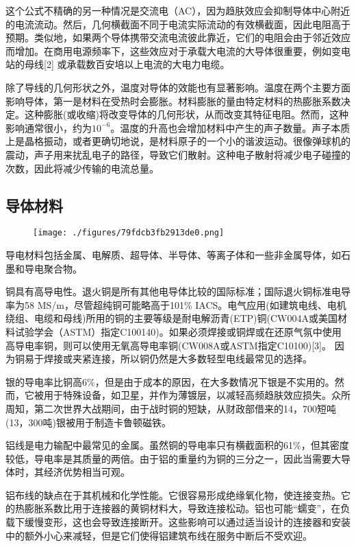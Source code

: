 这个公式不精确的另一种情况是交流电（AC），因为趋肤效应会抑制导体中心附近的电流流动。然后，几何横截面不同于电流实际流动的有效横截面，因此电阻高于预期。类似地，如果两个导体携带交流电流彼此靠近，它们的电阻会由于邻近效应而增加。在商用电源频率下，这些效应对于承载大电流的大导体很重要，例如变电站的母线[2] 或承载数百安培以上电流的大电力电缆。

除了导线的几何形状之外，温度对导体的效能也有显著影响。温度在两个主要方面影响导体，第一是材料在受热时会膨胀。材料膨胀的量由特定材料的热膨胀系数决定。这种膨胀(或收缩)将改变导体的几何形状，从而改变其特征电阻。然而，这种影响通常很小，约为$10^{-6}$。温度的升高也会增加材料中产生的声子数量。声子本质上是晶格振动，或者更确切地说，是材料原子的一个小的谐波运动。很像弹球机的震动，声子用来扰乱电子的路径，导致它们散射。这种电子散射将减少电子碰撞的次数，因此将减少传输的电流总量。

\subsection{导体材料}
\begin{figure}[ht]
\centering
\texttt{[image: ./figures/79fdcb3fb2913de0.png]}
\caption\label{fig_DDT_2}
\end{figure}

导电材料包括金属、电解质、超导体、半导体、等离子体和一些非金属导体，如石墨和导电聚合物。

铜具有高导电性。退火铜是所有其他电导体比较的国际标准；国际退火铜标准电导率为58 MS/m，尽管超纯铜可能略高于101\% IACS。电气应用(如建筑电线、电机绕组、电缆和母线)所用的铜的主要等级是耐电解沥青(ETP)铜(CW004A或美国材料试验学会（ASTM）指定C100140)。如果必须焊接或铜焊或在还原气氛中使用高导电率铜，则可以使用无氧高导电率铜(CW008A或ASTM指定C10100)[3]。 因为铜易于焊接或夹紧连接，所以铜仍然是大多数轻型电线最常见的选择。

银的导电率比铜高6\%，但是由于成本的原因，在大多数情况下银是不实用的。然而，它被用于特殊设备，如卫星，并作为薄镀层，以减轻高频趋肤效应损失。众所周知，第二次世界大战期间，由于战时铜的短缺，从财政部借来的14，700短吨(13，300吨)银被用于制造卡鲁顿磁铁。

铝线是电力输配中最常见的金属。虽然铜的导电率只有横截面积的61\%，但其密度较低，导电率是其质量的两倍。由于铝的重量约为铜的三分之一，因此当需要大导体时，其经济优势相当可观。

铝布线的缺点在于其机械和化学性能。它很容易形成绝缘氧化物，使连接变热。它的热膨胀系数比用于连接器的黄铜材料大，导致连接松动。铝也可能“蠕变”，在负载下缓慢变形，这也会导致连接断开。这些影响可以通过适当设计的连接器和安装中的额外小心来减轻，但是它们使得铝建筑布线在服务中断后不受欢迎。

